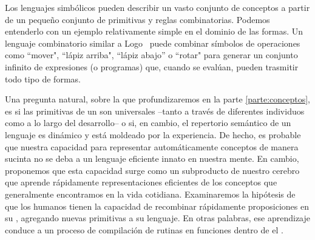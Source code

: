 
Los lenguajes simbólicos pueden describir un vasto conjunto de conceptos a partir de un pequeño conjunto de primitivas y reglas combinatorias. Podemos entenderlo con un ejemplo relativamente simple en el dominio de las formas. Un lenguaje combinatorio similar a Logo~\cite{abelson1974logo} puede combinar símbolos de operaciones como ``mover", ``lápiz arriba", ``lápiz abajo'' o ``rotar" para generar un conjunto infinito de expresiones (o programas) que, cuando se evalúan, pueden trasmitir todo tipo de formas.

Una pregunta natural, sobre la que profundizaremos en la parte \ref{parte:conceptos}, es si las primitivas de un \lot son universales --tanto a través de diferentes individuos como a lo largo del desarrollo-- o si, en cambio, el repertorio semántico de un lenguaje es dinámico y está moldeado por la experiencia. De hecho, es probable que nuestra capacidad para representar automáticamente conceptos de manera sucinta no se deba a un lenguaje eficiente innato en nuestra mente. En cambio, proponemos que esta capacidad surge como un subproducto de nuestro cerebro que aprende rápidamente representaciones eficientes de los conceptos que generalmente encontramos en la vida cotidiana. Examinaremos la hipótesis de que los humanos tienen la capacidad de recombinar rápidamente proposiciones en su \lot, agregando nuevas primitivas a su lenguaje. En otras palabras, ese aprendizaje conduce a un proceso de compilación de rutinas en funciones dentro de el \lot.

